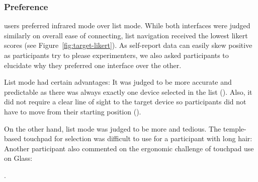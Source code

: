 \subsubsection{Preference}
 users preferred infrared mode over list mode. While both interfaces were judged similarly on overall ease of connecting, list navigation received the lowest likert scores (see Figure~\ref{fig:target-likert}). As self-report data can easily skew positive as participants try to please experimenters, we also asked participants to elucidate why they preferred one interface over the other.

List mode had certain advantages: It was judged to be more accurate and predictable as there was always exactly one device selected in the list (). Also, it did not require a clear line of sight to the target device so participants did not have to move from their starting position (). 

On the other hand, list mode was judged to be more  and tedious. The temple-based touchpad for selection was difficult to use for a participant with long hair:  Another participant also commented on the ergonomic challenge of touchpad use on Glass: 

.


